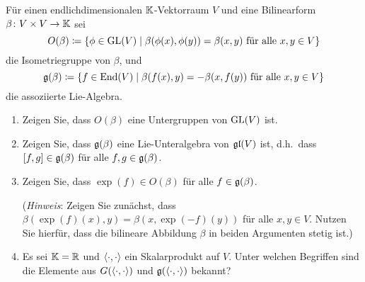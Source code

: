 \documentclass[a4paper,10pt]{scrartcl}
\begin{document}
\begin{question}
  Für einen endlichdimensionalen $\mathbb{K}$-Vektorraum $V$ und eine Bilinearform $\beta \colon V \times V \to \mathbb{K}$ sei
  \[
              O(\beta)
    \coloneqq \{ \phi \in \operatorname{GL}(V) \mid \text{$\beta(\phi(x), \phi(y)) = \beta(x,y)$ für alle $x,y \in V$} \}
  \]
  die Isometriegruppe von $\beta$, und
  \[
              \mathfrak{g}(\beta)
    \coloneqq \{ f \in \operatorname{End}(V) \mid \text{$\beta(f(x),y) = -\beta(x, f(y))$ für alle $x, y \in V$} \}
  \]
  die assoziierte Lie-Algebra.
  \begin{enumerate}[leftmargin=*]
    \item
      Zeigen Sie, dass $O(\beta)$ eine Untergruppen von $\operatorname{GL}(V)$ ist.
    \item
      Zeigen Sie, dass $\mathfrak{g}(\beta)$ eine Lie-Unteralgebra von $\mathfrak{gl}(V)$ ist, d.h.\ dass $[f,g] \in \mathfrak{g}(\beta)$ für alle $f, g \in \mathfrak{g}(\beta)$.
    \item
      Zeigen Sie, dass $\exp(f) \in O(\beta)$ für alle $f \in \mathfrak{g}(\beta)$.
      
      (\emph{Hinweis}:
       Zeigen Sie zunächst, dass $\beta(\exp(f)(x) ,y) = \beta(x, \exp(-f)(y))$ für alle $x, y \in V$.
       Nutzen Sie hierfür, dass die bilineare Abbildung $\beta$ in beiden Argumenten stetig ist.)
    \item
      Es sei $\mathbb{K} = \mathbb{R}$ und $\langle \cdot, \cdot \rangle$ ein Skalarprodukt auf $V$.
      Unter welchen Begriffen sind die Elemente aus $G(\langle \cdot, \cdot \rangle)$ und $\mathfrak{g}(\langle \cdot, \cdot \rangle)$ bekannt?
  \end{enumerate}
\end{question}


\end{document}
